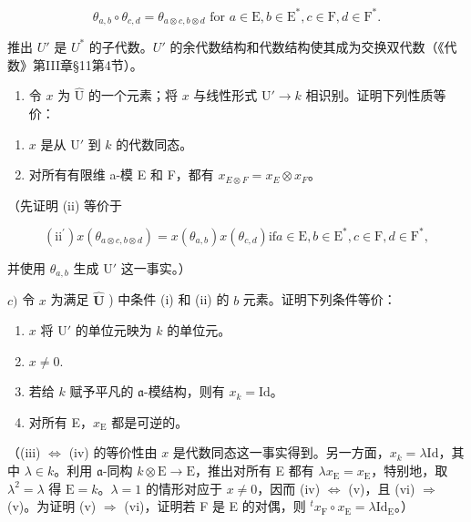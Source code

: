 \[
\theta_ {a, b} \circ \theta_ {c, d} = \theta_ {a \otimes c, b \otimes d} \text { for } a \in \mathrm{E}, b \in \mathrm{E} ^ {*}, c \in \mathrm{F}, d \in \mathrm{F} ^ {*}.
\]

推出 \(U'\) 是 \(U^{*}\) 的子代数。\(U'\) 的余代数结构和代数结构使其成为交换双代数（《代数》第III章§11第4节）。

\begin{enumerate}
\def\labelenumi{\alph{enumi})}
\setcounter{enumi}{1}
\tightlist
\item
  令 \(x\) 为 \(\hat{\mathrm{U}}\) 的一个元素；将 \(x\) 与线性形式 \(\mathrm{U}' \to k\) 相识别。证明下列性质等价：
\end{enumerate}

\begin{enumerate}
\def\labelenumi{(\roman{enumi})}
\item
  \(x\) 是从 \(\mathrm{U}'\) 到 \(k\) 的代数同态。
\item
  对所有有限维 a-模 E 和 F，都有 \(x_{E \otimes F} = x_{E} \otimes x_{F}\)。
\end{enumerate}

（先证明 (ii) 等价于

\[
\left(\mathrm{ii} ^ {\prime}\right) x \left(\theta_ {a \otimes c, b \otimes d}\right) = x \left(\theta_ {a, b}\right) x \left(\theta_ {c, d}\right) \text {if} a \in \mathrm{E}, b \in \mathrm{E} ^ {*}, c \in \mathrm{F}, d \in \mathrm{F} ^ {*},
\]

并使用 \(\theta_{a,b}\) 生成 \(\mathrm{U}'\) 这一事实。）

\(c)\) 令 \(x\) 为满足 \(\hat{\mathbf{U}}\) ) 中条件 (i) 和 (ii) 的 \(b\) 元素。证明下列条件等价：

\begin{enumerate}
\def\labelenumi{(\roman{enumi})}
\setcounter{enumi}{2}
\item
  \(x\) 将 \(\mathrm{U}'\) 的单位元映为 \(k\) 的单位元。
\item
  \(x \neq 0.\)
\item
  若给 \(k\) 赋予平凡的 \(\mathfrak{a}\)-模结构，则有 \(x_{k} = \mathrm{Id}\)。
\item
  对所有 E，\(x_{\mathrm{E}}\) 都是可逆的。
\end{enumerate}

（(iii) \(\Longleftrightarrow\) (iv) 的等价性由 \(x\) 是代数同态这一事实得到。另一方面，\(x_{k} = \lambda \mathrm{Id}\)，其中 \(\lambda \in k\)。利用 \(\mathfrak{a}\)-同构 \(k \otimes \mathrm{E} \to \mathrm{E}\)，推出对所有 E 都有 \(\lambda x_{\mathrm{E}} = x_{\mathrm{E}}\)，特别地，取 \(\lambda^2 = \lambda\) 得 \(\mathrm{E} = k\)。\(\lambda = 1\) 的情形对应于 \(x \neq 0\)，因而 (iv) \(\Longleftrightarrow\) (v)，且 (vi) \(\Longrightarrow\) (v)。为证明 (v) \(\Longrightarrow\) (vi)，证明若 F 是 E 的对偶，则 \(^t x_{\mathrm{F}} \circ x_{\mathrm{E}} = \lambda \mathrm{Id}_{\mathrm{E}}\)。）

